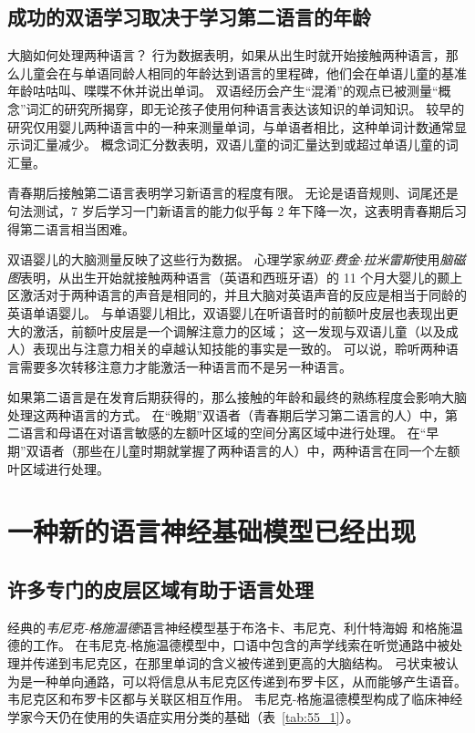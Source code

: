 \subsection{成功的双语学习取决于学习第二语言的年龄}

大脑如何处理两种语言？
行为数据表明，如果从出生时就开始接触两种语言，那么儿童会在与单语同龄人相同的年龄达到语言的里程碑，他们会在单语儿童的基准年龄咕咕叫、喋喋不休并说出单词。
双语经历会产生“混淆”的观点已被测量“概念”词汇的研究所揭穿，即无论孩子使用何种语言表达该知识的单词知识。
较早的研究仅用婴儿两种语言中的一种来测量单词，与单语者相比，这种单词计数通常显示词汇量减少。
概念词汇分数表明，双语儿童的词汇量达到或超过单语儿童的词汇量。


青春期后接触第二语言表明学习新语言的程度有限。
无论是语音规则、词尾还是句法测试，7 岁后学习一门新语言的能力似乎每 2 年下降一次，这表明青春期后习得第二语言相当困难。


双语婴儿的大脑测量反映了这些行为数据。
心理学家\textit{纳亚$\cdot$费金$\cdot$拉米雷斯}使用\textit{脑磁图}表明，从出生开始就接触两种语言（英语和西班牙语）的 11 个月大婴儿的颞上区激活对于两种语言的声音是相同的，并且大脑对英语声音的反应是相当于同龄的英语单语婴儿。
与单语婴儿相比，双语婴儿在听语音时的前额叶皮层也表现出更大的激活，前额叶皮层是一个调解注意力的区域；
这一发现与双语儿童（以及成人）表现出与注意力相关的卓越认知技能的事实是一致的。
可以说，聆听两种语言需要多次转移注意力才能激活一种语言而不是另一种语言。


如果第二语言是在发育后期获得的，那么接触的年龄和最终的熟练程度会影响大脑处理这两种语言的方式。
在“晚期”双语者（青春期后学习第二语言的人）中，第二语言和母语在对语言敏感的左额叶区域的空间分离区域中进行处理。
在“早期”双语者（那些在儿童时期就掌握了两种语言的人）中，两种语言在同一个左额叶区域进行处理。



\section{一种新的语言神经基础模型已经出现}

\subsection{许多专门的皮层区域有助于语言处理}

经典的\textit{韦尼克-格施温德}语言神经模型基于布洛卡\cite{broca1861remarques}、韦尼克\cite{wernicke1974aphasische}、利什特海姆\cite{lichtheim1885aphasia} 和格施温德\cite{geschwind1970organization}的工作。
在韦尼克-格施温德模型中，口语中包含的声学线索在听觉通路中被处理并传递到韦尼克区，在那里单词的含义被传递到更高的大脑结构。
弓状束被认为是一种单向通路，可以将信息从韦尼克区传递到布罗卡区，从而能够产生语音。
韦尼克区和布罗卡区都与关联区相互作用。
韦尼克-格施温德模型构成了临床神经学家今天仍在使用的失语症实用分类的基础（表~\ref{tab:55_1}）。


